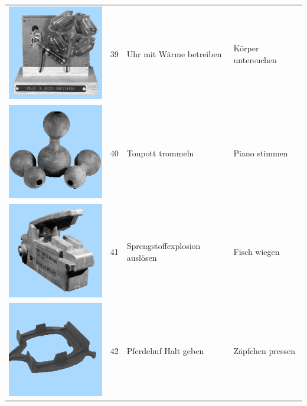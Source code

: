 \documentclass[
  english,
  man,floatsintext]{apa7}
\begin{document}
\begin{center}
\begin{ThreePartTable}
\begin{longtable}{llll}
\includegraphics[valign=c, scale=0.19]{../materials/unfamiliar/39.png} & 39 & Uhr mit Wärme betreiben & Körper untersuchen\\
\includegraphics[valign=c, scale=0.19]{../materials/unfamiliar/40.png} & 40 & Tonpott trommeln & Piano stimmen\\
\includegraphics[valign=c, scale=0.19]{../materials/unfamiliar/41.png} & 41 & Sprengstoffexplosion auslösen & Fisch wiegen\\
\includegraphics[valign=c, scale=0.19]{../materials/unfamiliar/42.png} & 42 & Pferdehuf Halt geben & Zäpfchen pressen\\

\end{longtable}
\end{ThreePartTable}
\end{center}
\end{document}
